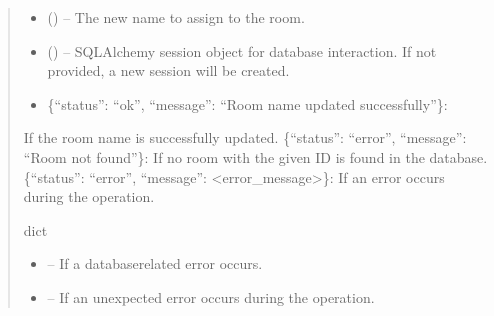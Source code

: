 \documentclass[letterpaper,10pt,english]{sphinxmanual}
\begin{document}
\begin{fulllineitems}
\begin{fulllineitems}
\begin{quote}
\begin{description}
\begin{itemize}
\item {} 
\sphinxAtStartPar
{} () – The new name to assign to the room.

\item {} 
\sphinxAtStartPar
{} (\sphinxstyleliteralemphasis{\sphinxupquote{, }}) – SQLAlchemy session object for database interaction.
If not provided, a new session will be created.

\end{itemize}

\sphinxAtStartPar
\begin{description}
\begin{itemize}
\item {} 
\sphinxAtStartPar
\{“status”: “ok”, “message”: “Room name updated successfully”\}:

\end{itemize}

\sphinxAtStartPar
If the room name is successfully updated.
\sphinxhyphen{} \{“status”: “error”, “message”: “Room not found”\}:
If no room with the given ID is found in the database.
\sphinxhyphen{} \{“status”: “error”, “message”: <error\_message>\}:
If an error occurs during the operation.

\end{description}


\sphinxAtStartPar
dict

\begin{itemize}
\item {} 
\sphinxAtStartPar
{} – If a database\sphinxhyphen{}related error occurs.

\item {} 
\sphinxAtStartPar
{} – If an unexpected error occurs during the operation.

\end{itemize}

\end{description}\end{quote}

\end{fulllineitems}


\end{fulllineitems}
\end{document}
